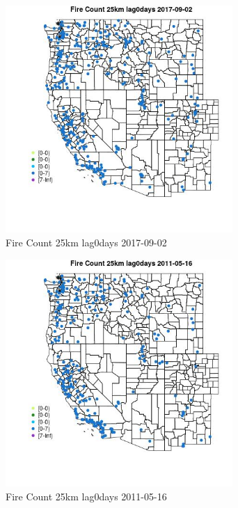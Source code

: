 \begin{figure} 
\centering  
\includegraphics[width=0.77\textwidth]{Code_Outputs/Report_ML_input_PM25_Step4_part_e_de_duplicated_aves_compiled_2019-05-20wNAs_MapObsFire_Count_25km_lag0days2017-09-02.jpg} 
\caption{\label{fig:Report_ML_input_PM25_Step4_part_e_de_duplicated_aves_compiled_2019-05-20wNAsMapObsFire_Count_25km_lag0days2017-09-02}Fire Count 25km lag0days 2017-09-02} 
\end{figure} 
 

\clearpage 

\begin{figure} 
\centering  
\includegraphics[width=0.77\textwidth]{Code_Outputs/Report_ML_input_PM25_Step4_part_e_de_duplicated_aves_compiled_2019-05-20wNAs_MapObsFire_Count_25km_lag0days2011-05-16.jpg} 
\caption{\label{fig:Report_ML_input_PM25_Step4_part_e_de_duplicated_aves_compiled_2019-05-20wNAsMapObsFire_Count_25km_lag0days2011-05-16}Fire Count 25km lag0days 2011-05-16} 
\end{figure} 
 

